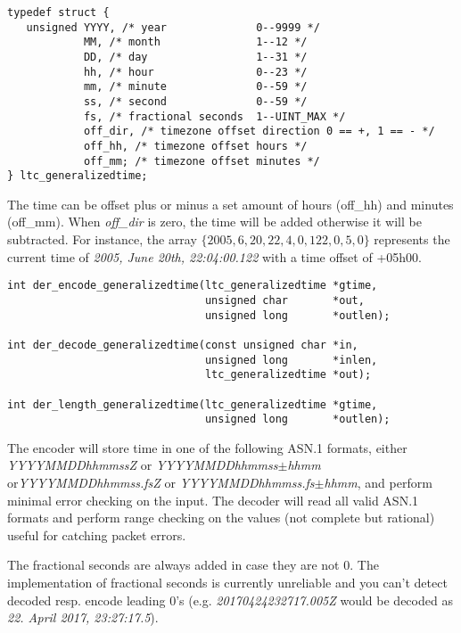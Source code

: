 \documentclass[synpaper]{book}
\begin{document}
\begin{verbatim}
typedef struct {
   unsigned YYYY, /* year              0--9999 */
            MM, /* month               1--12 */
            DD, /* day                 1--31 */
            hh, /* hour                0--23 */
            mm, /* minute              0--59 */
            ss, /* second              0--59 */
            fs, /* fractional seconds  1--UINT_MAX */
            off_dir, /* timezone offset direction 0 == +, 1 == - */
            off_hh, /* timezone offset hours */
            off_mm; /* timezone offset minutes */
} ltc_generalizedtime;
\end{verbatim}

The time can be offset plus or minus a set amount of hours (off\_hh) and minutes (off\_mm).  When \textit{off\_dir} is zero, the time will be added otherwise it
will be subtracted.  For instance, the array $\lbrace 2005, 6, 20, 22, 4, 0, 122, 0, 5, 0 \rbrace$ represents the current time of
\textit{2005, June 20th, 22:04:00.122} with a time offset of +05h00.

\begin{verbatim}
int der_encode_generalizedtime(ltc_generalizedtime *gtime,
                               unsigned char       *out,
                               unsigned long       *outlen);

int der_decode_generalizedtime(const unsigned char *in,
                               unsigned long       *inlen,
                               ltc_generalizedtime *out);

int der_length_generalizedtime(ltc_generalizedtime *gtime,
                               unsigned long       *outlen);
\end{verbatim}

The encoder will store time in one of the following ASN.1 formats, either \textit{YYYYMMDDhhmmssZ} or
\textit{YYYYMMDDhhmmss$\pm$hhmm} or\textit{YYYYMMDDhhmmss.fsZ} or \textit{YYYYMMDDhhmmss.fs$\pm$hhmm},
and perform minimal error checking on the input.
The decoder will read all valid ASN.1 formats and perform range checking on the values (not complete but
rational) useful for catching packet errors.

The fractional seconds are always added in case they are not $0$.
The implementation of fractional seconds is currently unreliable and you can't detect decoded
resp. encode leading $0$'s (e.g. \textit{20170424232717.005Z} would be decoded as
\textit{22. April 2017, 23:27:17.5}).
\end{document}
